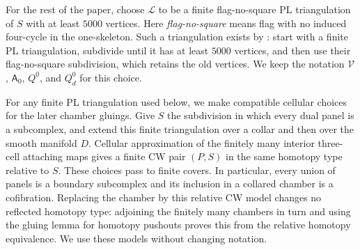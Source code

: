 For the rest of the paper, choose $\mathcal L$ to be a finite
flag-no-square PL triangulation of $S$ with at least $5000$ vertices.
Here \emph{flag-no-square} means flag with no induced four-cycle in
the one-skeleton.  Such a triangulation exists by
\cite[Proposition~2.13 and Corollary~2.14]{PrzytyckiSwiatkowski2009}:
start with a finite PL triangulation, subdivide until it has at least
$5000$ vertices, and then use their flag-no-square subdivision, which
retains the old vertices.  We keep the notation $\mathcal V$,
$\mathsf A_0$, $Q^0$, and $Q^0_d$ for this choice.

For any finite PL triangulation used below, we make compatible cellular
choices for the later chamber gluings.  Give $S$ the subdivision in which every dual panel is a
subcomplex, and extend this finite triangulation over a collar and
then over the smooth manifold $D$.  Cellular approximation of the
finitely many interior three-cell attaching maps gives a finite CW
pair $(P,S)$ in the same homotopy type relative to $S$.  These choices
pass to finite covers.  In particular, every union of panels is a
boundary subcomplex and its inclusion in a collared chamber is a
cofibration.  Replacing the chamber by this relative CW model changes
no reflected homotopy type: adjoining the finitely many chambers in
turn and using the gluing lemma for homotopy pushouts proves this from
the relative homotopy equivalence.  We use these models without
changing notation.
